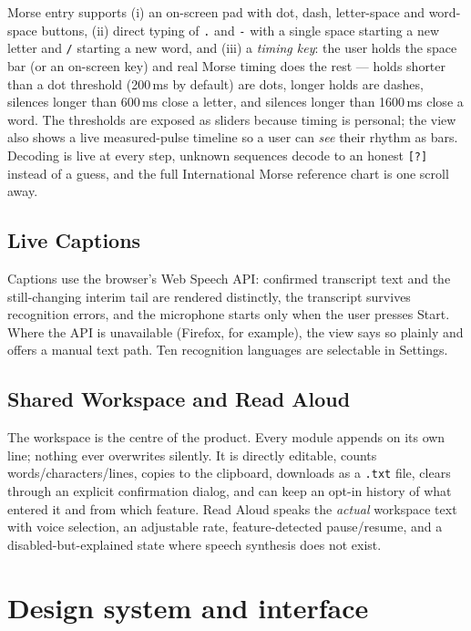 \documentclass[11pt,a4paper]{article}
\newcommand{\code}[1]{\texttt{#1}}
\begin{document}
Morse entry supports (i) an on-screen pad with dot, dash, letter-space and word-space buttons, (ii) direct typing of \code{.} and \code{-} with a single space starting a new letter and \code{/} starting a new word, and (iii) a \emph{timing key}: the user holds the space bar (or an on-screen key) and real Morse timing does the rest --- holds shorter than a dot threshold (200\,ms by default) are dots, longer holds are dashes, silences longer than 600\,ms close a letter, and silences longer than 1600\,ms close a word. The thresholds are exposed as sliders because timing is personal; the view also shows a live measured-pulse timeline so a user can \emph{see} their rhythm as bars. Decoding is live at every step, unknown sequences decode to an honest \code{[?]} instead of a guess, and the full International Morse reference chart is one scroll away.

\subsection{Live Captions}

Captions use the browser's Web Speech API: confirmed transcript text and the still-changing interim tail are rendered distinctly, the transcript survives recognition errors, and the microphone starts only when the user presses Start. Where the API is unavailable (Firefox, for example), the view says so plainly and offers a manual text path. Ten recognition languages are selectable in Settings.

\subsection{Shared Workspace and Read Aloud}

The workspace is the centre of the product. Every module appends on its own line; nothing ever overwrites silently. It is directly editable, counts words/characters/lines, copies to the clipboard, downloads as a \code{.txt} file, clears through an explicit confirmation dialog, and can keep an opt-in history of what entered it and from which feature. Read Aloud speaks the \emph{actual} workspace text with voice selection, an adjustable rate, feature-detected pause/resume, and a disabled-but-explained state where speech synthesis does not exist.

\section{Design system and interface}
\end{document}

